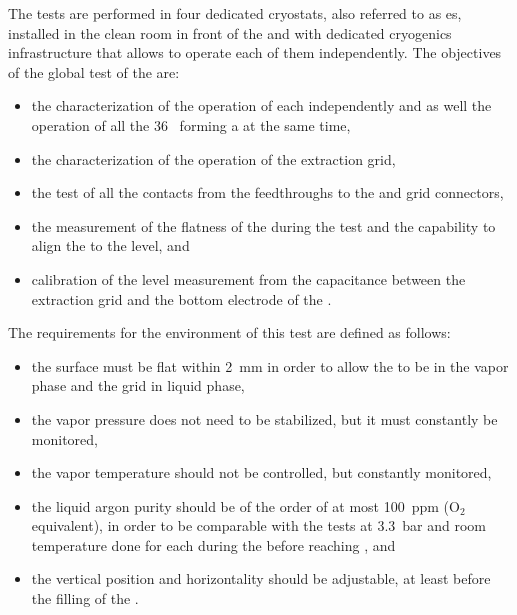 The tests are performed in four dedicated cryostats, also referred to as \coldbox{}es, installed in the clean room in front of the  and with dedicated cryogenics infrastructure that allows to operate each of them independently.
The objectives of the global test of the  are:
\begin{itemize}
\item the characterization of the  operation of each  independently and as well the  operation of all the 36~ forming a  at the same time,
\item the characterization of the  operation of the extraction grid,
\item the test of all the  contacts from the feedthroughs to the  and grid connectors,
\item the measurement of the flatness of the  during the test and the capability to align the  to the  level, and 
\item calibration of the level measurement from the capacitance between the extraction grid and the bottom electrode of the .
\end{itemize}

The requirements for the environment of this test are defined as follows:
\begin{itemize}
\item the  surface must be flat within 2~mm in order to allow the  to be in the vapor phase and the grid in liquid phase,
\item the vapor pressure does not need to be stabilized, but it must constantly be monitored,
\item the vapor temperature should not be controlled, but constantly monitored,
\item the liquid argon purity should be of the order of at most 100~ppm (O$_2$ equivalent), in order to be comparable with the tests at 3.3~bar and room temperature done for each  during the  before reaching \surf, and
\item the  vertical position and horizontality should be adjustable, at least before the filling of the  \coldbox.
\end{itemize}

